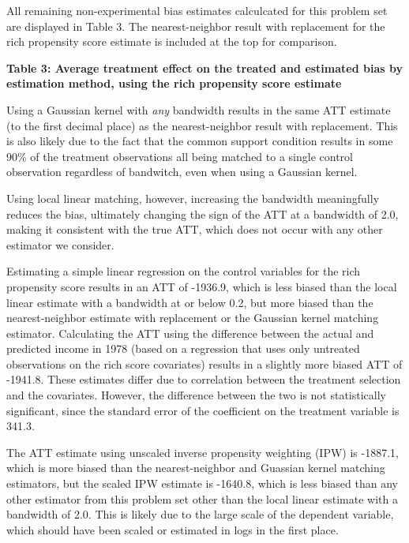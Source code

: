 \documentclass{article}
\begin{document}
All remaining non-experimental bias estimates calculcated for this problem set are displayed in Table 3. The nearest-neighbor result with replacement for the rich propensity score estimate is included at the top for comparison.
\pagebreak
\begin{center}
        \textbf{Table 3: Average treatment effect on the treated and estimated bias by estimation method, using the rich propensity score estimate} \\
        
\end{center}
\noindent Using a Gaussian kernel with \textit{any} bandwidth results in the same ATT estimate (to the first decimal place) as the nearest-neighbor result with replacement. This is also likely due to the fact that the common support condition results in some 90\% of the treatment observations all being matched to a single control observation regardless of bandwitch, even when using a Gaussian kernel.

Using local linear matching, however, increasing the bandwidth meaningfully reduces the bias, ultimately changing the sign of the ATT at a bandwidth of 2.0, making it consistent with the true ATT, which does not occur with any other estimator we consider.

Estimating a simple linear regression on the control variables for the rich propensity score results in an ATT of -1936.9, which is less biased than the local linear estimate with a bandwidth at or below 0.2, but more biased than the nearest-neighbor estimate with replacement or the Gaussian kernel matching estimator. Calculating the ATT using the difference between the actual and predicted income in 1978 (based on a regression that uses only untreated observations on the rich score covariates) results in a slightly more biased ATT of -1941.8. These estimates differ due to correlation between the treatment selection and the covariates. However, the difference between the two is not statistically significant, since the standard error of the coefficient on the treatment variable is 341.3.

The ATT estimate using unscaled inverse propensity weighting (IPW) is -1887.1, which is more biased than the nearest-neighbor and Guassian kernel matching estimators, but the scaled IPW estimate is -1640.8, which is less biased than any other estimator from this problem set other than the local linear estimate with a bandwidth of 2.0. This is likely due to the large scale of the dependent variable, which should have been scaled or estimated in logs in the first place.
\end{document}
